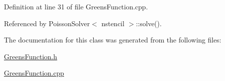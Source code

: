 Definition at line 31 of file GreensFunction.cpp.



Referenced by PoissonSolver$<$ nstencil $>$::solve().



The documentation for this class was generated from the following files:\begin{DoxyCompactItemize}
\item 
\hyperlink{GreensFunction_8h}{GreensFunction.h}\item 
\hyperlink{GreensFunction_8cpp}{GreensFunction.cpp}\end{DoxyCompactItemize}
